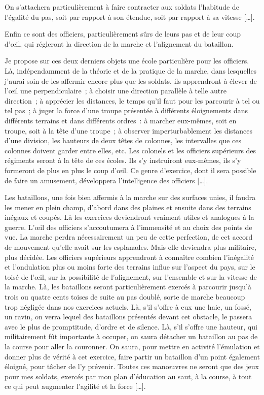\documentclass[french,twoside]{book} %
\begin{document}
On s’attachera particulièrement à faire contracter aux soldats l’habitude de l’égalité du pas, soit par rapport à son étendue, soit par rapport à sa vitesse […].\par
Enfin ce sont des officiers, particulièrement sûrs de leurs pas et de leur coup d’œil, qui régleront la direction de la marche et l’alignement du bataillon.\par
Je propose sur ces deux derniers objets une école particulière pour les officiers. Là, indépendamment de la théorie et de la pratique de la marche, dans lesquelles j’aurai soin de les affermir encore plus que les soldats, ils apprendront à élever de l’œil une perpendiculaire ; à choisir une direction parallèle à telle autre direction ; à apprécier les distances, le temps qu’il faut pour les parcourir à tel ou tel pas ; à juger la force d’une troupe présentée à différents éloignements dans différents terrains et dans différents ordres : à marcher eux-mêmes, soit en troupe, soit à la tête d’une troupe ; à observer imperturbablement les distances d’une division, les hauteurs de deux têtes de colonnes, les intervalles que ces colonnes doivent garder entre elles, etc. Les colonels et les officiers supérieurs des régiments seront à la tête de ces écoles. Ils s’y instruiront eux-mêmes, ils s’y formeront de plus en plus le coup d’œil. Ce genre d’exercice, dont il sera possible de faire un amusement, développera l’intelligence des officiers […].\par
Les bataillons, une fois bien affermis à la marche sur des surfaces unies, il faudra les mener en plein champ, d’abord dans des plaines et ensuite dans des terrains inégaux et coupés. Là les exercices deviendront vraiment utiles et analogues à la guerre. L’œil des officiers s’accoutumera à l’immensité et au choix des points de vue. La marche perdra nécessairement un peu de cette perfection, de cet accord de mouvement qu’elle avait sur les esplanades. Mais elle deviendra plus militaire, plus décidée. Les officiers supérieurs apprendront à connaître combien l’inégalité et l’ondulation plus ou moins forte des terrains influe sur l’aspect du pays, sur le toisé de l’œil, sur la possibilité de l’alignement, sur l’ensemble et sur la vitesse de la marche. Là, les bataillons seront particulièrement exercés à parcourir jusqu’à trois ou quatre cents toises de suite au pas doublé, sorte de marche beaucoup trop négligée dans nos exercices actuels. Là, s’il s’offre à eux une haie, un fossé, un ravin, on verra lequel des bataillons présentés devant cet obstacle, le passera avec le plus de promptitude, d’ordre et de silence. Là, s’il s’offre une hauteur, qui militairement fût importante à occuper, on saura détacher un bataillon au pas de la course pour aller la couronner. On saura, pour mettre en activité l’émulation et donner plus de vérité à cet exercice, faire partir un bataillon d’un point également éloigné, pour tâcher de l’y prévenir. Toutes ces manœuvres ne seront que des jeux pour mes soldats, exercés par mon plan d’éducation au saut, à la course, à tout ce qui peut augmenter l’agilité et la force […].\par
\end{document}
